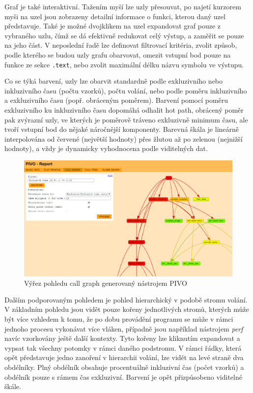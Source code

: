 \documentclass[czech,BP]{thesiskiv}
\begin{document}
Graf je také interaktivní. Tažením myší lze uzly přesouvat, po najetí kurzorem myši na uzel jsou zobrazeny detailní informace o funkci, kterou daný uzel představuje. Také je možné dvojklikem na uzel expandovat graf pouze z vybraného uzlu, čímž se dá efektivně redukovat celý výstup, a zaměřit se pouze na jeho část. V neposlední řadě lze definovat filtrovací kritéria, zvolit způsob, podle kterého se budou uzly grafu obarvovat, omezit vstupní bod pouze na funkce ze sekce \texttt{.text}, nebo zvolit maximální délku názvu symbolu ve výstupu.

Co se týká barvení, uzly lze obarvit standardně podle exkluzivního nebo inkluzivního času (počtu vzorků), počtu volání, nebo podle poměru inkluzivního a exkluzivního času (popř. obráceným poměrem). Barvení pomocí poměru exkluzivního ku inkluzivního času dopomáhá odhalit hot path, obrácený poměr pak zvýrazní uzly, ve kterých je poměrově tráveno exkluzivně minimum času, ale tvoří vstupní bod do nějaké náročnější komponenty. Barevná škála je lineárně interpolována od červené (největší hodnoty) přes žlutou až po zelenou (nejnižší hodnoty), a vždy je dynamicky vyhodnocena podle viditelných dat.

\begin{figure}[h]
    \centering
    \includegraphics[interpolate,width=1.0\textwidth]{img/pivo_graph.png}
    \caption{Výřez pohledu call graph generovaný nástrojem PIVO}
    \label{obr:implgraph}
\end{figure}

Dalším podporovaným pohledem je pohled hierarchický v podobě stromu volání. V základním pohledu jsou vidět pouze kořeny jednotlivých stromů, kterých může být více vzhledem k tomu, že po dobu provádění programu se může v rámci jednoho procesu vykonávat více vláken, případně jsou například nástrojem \emph{perf} navíc vzorkovány ještě další kontexty. Tyto kořeny lze kliknutím expandovat a vypsat tak všechny potomky v rámci daného podstromu. V rámci řádky, která opět představuje jedno zanoření v hierarchii volání, lze vidět na levé straně dva obdélníky. Plný obdélník obsahuje procentuálně inkluzivní čas (počet vzorků) a obdélník pouze s rámem čas exkluzivní. Barvení je opět přizpůsobeno viditelné škále.
\end{document}
